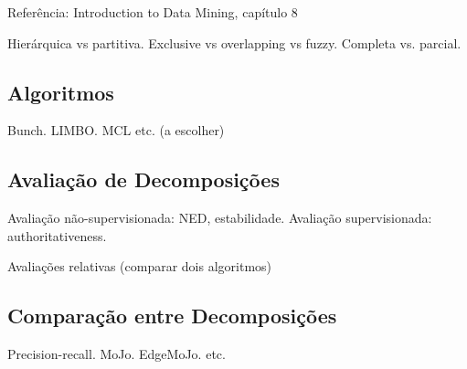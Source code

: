\documentclass{article}
\begin{document}
Referência: Introduction to Data Mining, capítulo 8 \cite{Tan2005}

Hierárquica vs partitiva.
Exclusive vs overlapping vs fuzzy.
Completa vs. parcial.

\subsection{Algoritmos}

Bunch. LIMBO. MCL etc. (a escolher)

\subsection{Avaliação de Decomposições}

Avaliação não-supervisionada: NED, estabilidade.
Avaliação supervisionada: authoritativeness.

Avaliações relativas (comparar dois algoritmos)

\subsection{Comparação entre Decomposições}

Precision-recall.
MoJo.
EdgeMoJo.
etc.



\end{document}
